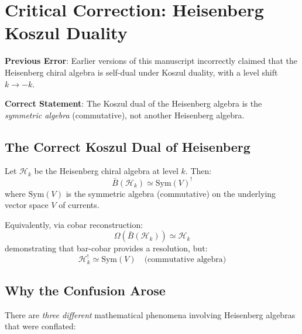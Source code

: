 \section{Critical Correction: Heisenberg Koszul Duality}
\label{sec:heisenberg-correction-intro}

\begin{tcolorbox}[colback=red!5!white,colframe=red!75!black,title=Important Correction to Earlier Versions]
\textbf{Previous Error}: Earlier versions of this manuscript incorrectly claimed that the Heisenberg chiral algebra is self-dual under Koszul duality, with a level shift $k \to -k$.

\textbf{Correct Statement}: The Koszul dual of the Heisenberg algebra is the \emph{symmetric algebra} (commutative), not another Heisenberg algebra.
\end{tcolorbox}

\subsection{The Correct Koszul Dual of Heisenberg}

\begin{theorem}
\label{thm:heisenberg-koszul-correct-intro}
Let $\mathcal{H}_k$ be the Heisenberg chiral algebra at level $k$. Then:
\begin{equation}
\bar{B}(\mathcal{H}_k) \simeq \text{Sym}(V)^!
\end{equation}
where $\text{Sym}(V)$ is the symmetric algebra (commutative) on the underlying vector space $V$ of currents.

Equivalently, via cobar reconstruction:
\begin{equation}
\Omega(\bar{B}(\mathcal{H}_k)) \simeq \mathcal{H}_k
\end{equation}
demonstrating that bar-cobar provides a resolution, but:
\begin{equation}
\mathcal{H}_k^! \simeq \text{Sym}(V) \quad \text{(commutative algebra)}
\end{equation}
\end{theorem}

\subsection{Why the Confusion Arose}

There are \emph{three different} mathematical phenomena involving Heisenberg algebras that were conflated:

